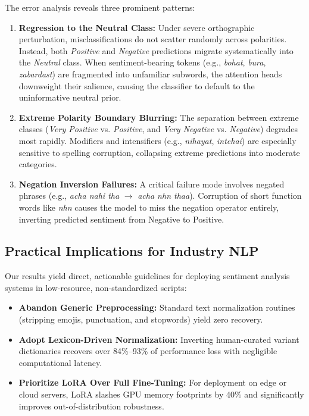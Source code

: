 The error analysis reveals three prominent patterns:
\begin{enumerate}
    \item \textbf{Regression to the Neutral Class:} Under severe orthographic perturbation, misclassifications do not scatter randomly across polarities. Instead, both \textit{Positive} and \textit{Negative} predictions migrate systematically into the \textit{Neutral} class. When sentiment-bearing tokens (e.g., \textit{bohat}, \textit{bura}, \textit{zabardast}) are fragmented into unfamiliar subwords, the attention heads downweight their salience, causing the classifier to default to the uninformative neutral prior.
    \item \textbf{Extreme Polarity Boundary Blurring:} The separation between extreme classes (\textit{Very Positive} vs. \textit{Positive}, and \textit{Very Negative} vs. \textit{Negative}) degrades most rapidly. Modifiers and intensifiers (e.g., \textit{nihayat}, \textit{intehai}) are especially sensitive to spelling corruption, collapsing extreme predictions into moderate categories.
    \item \textbf{Negation Inversion Failures:} A critical failure mode involves negated phrases (e.g., \textit{acha nahi tha} $\rightarrow$ \textit{acha nhn thaa}). Corruption of short function words like \textit{nhn} causes the model to miss the negation operator entirely, inverting predicted sentiment from Negative to Positive.
\end{enumerate}

\subsection{Practical Implications for Industry NLP}
Our results yield direct, actionable guidelines for deploying sentiment analysis systems in low-resource, non-standardized scripts:
\begin{itemize}
    \item \textbf{Abandon Generic Preprocessing:} Standard text normalization routines (stripping emojis, punctuation, and stopwords) yield zero recovery.
    \item \textbf{Adopt Lexicon-Driven Normalization:} Inverting human-curated variant dictionaries recovers over 84\%--93\% of performance loss with negligible computational latency.
    \item \textbf{Prioritize LoRA Over Full Fine-Tuning:} For deployment on edge or cloud servers, LoRA slashes GPU memory footprints by 40\% and significantly improves out-of-distribution robustness.
\end{itemize}

